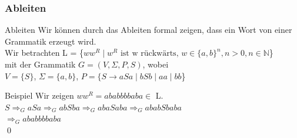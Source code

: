 \subsubsection{Ableiten}
\begin{frame}[fragile]{Ableiten}
    Wir können durch das Ableiten formal zeigen, dass ein Wort von einer Grammatik erzeugt wird.\\
    \small{Wir betrachten L = \{$ww^R\;|\;w^R\text{ ist w rückwärts, }w \in \{a, b\}^n, n>0, n\in \mathbb{N}$\}\\
        mit der Grammatik $G=(V,\Sigma,P,S)$, wobei\\
        $V=\{S\}$, $\Sigma=\{a,b\}$, $P = \{S \rightarrow aSa \mid bSb \mid aa \mid bb$\}}
    \begin{exampleblock}{Beispiel}
        Wir zeigen $ww^R = ababbbbaba \in$ L.\\
        \small{$S\Rightarrow_G aSa \Rightarrow_G abSba \Rightarrow_G  abaSaba \Rightarrow_G ababSbaba$ \\ $\Rightarrow_G ababbbbaba$}\\\qed
    \end{exampleblock}
\end{frame}

